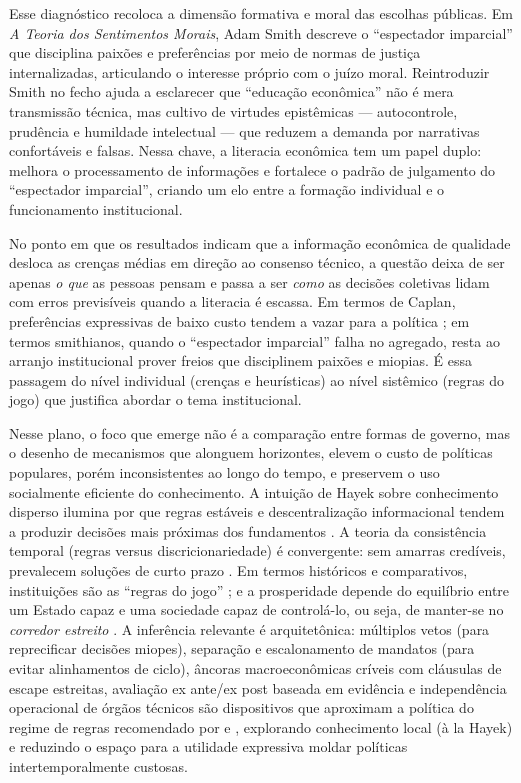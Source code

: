 Esse diagnóstico recoloca a dimensão formativa e moral das escolhas públicas. Em \textit{A Teoria dos Sentimentos Morais}, Adam Smith descreve o “espectador imparcial” que disciplina paixões e preferências por meio de normas de justiça internalizadas, articulando o interesse próprio com o juízo moral. Reintroduzir Smith no fecho ajuda a esclarecer que “educação econômica” não é mera transmissão técnica, mas cultivo de virtudes epistêmicas — autocontrole, prudência e humildade intelectual — que reduzem a demanda por narrativas confortáveis e falsas. Nessa chave, a literacia econômica tem um papel duplo: melhora o processamento de informações e fortalece o padrão de julgamento do “espectador imparcial”, criando um elo entre a formação individual e o funcionamento institucional.

No ponto em que os resultados indicam que a informação econômica de qualidade desloca as crenças médias em direção ao consenso técnico, a questão deixa de ser apenas \textit{o que} as pessoas pensam e passa a ser \textit{como} as decisões coletivas lidam com erros previsíveis quando a literacia é escassa. Em termos de Caplan, preferências expressivas de baixo custo tendem a vazar para a política \cite{The_Myth_of_the_Rational_Voter}; em termos smithianos, quando o “espectador imparcial” falha no agregado, resta ao arranjo institucional prover freios que disciplinem paixões e miopias. É essa passagem do nível individual (crenças e heurísticas) ao nível sistêmico (regras do jogo) que justifica abordar o tema institucional.

Nesse plano, o foco que emerge não é a comparação entre formas de governo, mas o desenho de mecanismos que alonguem horizontes, elevem o custo de políticas populares, porém inconsistentes ao longo do tempo, e preservem o uso socialmente eficiente do conhecimento. A intuição de Hayek sobre conhecimento disperso ilumina por que regras estáveis e descentralização informacional tendem a produzir decisões mais próximas dos fundamentos \cite{hayek_knowledge_use}. A teoria da consistência temporal (regras versus discricionariedade) é convergente: sem amarras credíveis, prevalecem soluções de curto prazo \cite{prescott1977,barro1983}. Em termos históricos e comparativos, instituições são as “regras do jogo” \cite{north1990institutions}; e a prosperidade depende do equilíbrio entre um Estado capaz e uma sociedade capaz de controlá-lo, ou seja, de manter-se no \textit{corredor estreito} \cite{Acemoglu2019,acemoglu2019narrow}. A inferência relevante é arquitetônica: múltiplos vetos (para reprecificar decisões miopes), separação e escalonamento de mandatos (para evitar alinhamentos de ciclo), âncoras macroeconômicas críveis com cláusulas de escape estreitas, avaliação ex ante/ex post baseada em evidência e independência operacional de órgãos técnicos são dispositivos que aproximam a política do regime de regras recomendado por  e , explorando conhecimento local (à la Hayek) e reduzindo o espaço para a utilidade expressiva moldar políticas intertemporalmente custosas.

